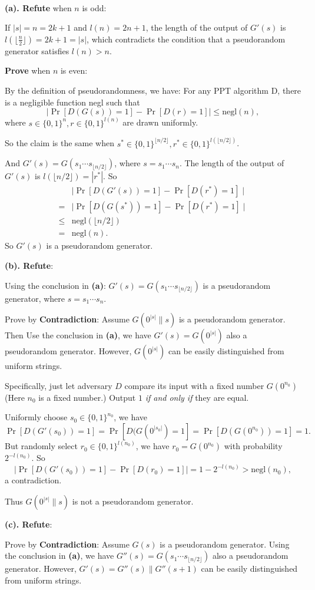 \documentclass[12pt]{article}
\newcommand{\negl}{\text{negl}}
\newenvironment{problem}[2][Problem]{\begin{trivlist}
\item[\hskip \labelsep {\bfseries #1}\hskip \labelsep {\bfseries #2.}]}{\end{trivlist}}
\begin{document}
\begin{problem}{3.6}
$ $\par
\textbf{(a). Refute} when $n$ is odd: \par
If $|s|=n=2k+1$ and $l(n)=2n+1$, the length of the output of $G'(s)$ is $l(\lfloor\frac n2\rfloor)=2k+1=|s|$, which contradicts the condition that a pseudorandom generator satisfies $l(n)>n$.\par
\vspace{2ex}
\textbf{Prove} when $n$ is even:\par
By the definition of pseudorandomness, we have: For any PPT algorithm D, there is a negligible function negl such that
\[ \mid\Pr[D(G(s))=1]-\Pr[D(r)=1]\mid\le\negl(n), \]
where $s\in\{0,1\}^n,r\in\{0,1\}^{l(n)}$ are drawn uniformly.\par
So the claim is the same when $s^*\in\{0,1\}^{\lfloor n/2\rfloor},r^*\in\{0,1\}^{l(\lfloor n/2\rfloor)}$.\par
And $G'(s)=G(s_1\cdots s_{\lfloor n/2\rfloor})$, where $s=s_1\cdots s_n$. The length of the output of $G'(s)$ is $l(\lfloor n/2\rfloor)=|r^*|$. So 
\begin{align*}
    &\mid\Pr[D(G'(s))=1]-\Pr[D(r^*)=1]\mid\\
    =&\mid\Pr[D(G(s^*))=1]-\Pr[D(r^*)=1]\mid\\
    \le &\negl(\lfloor n/2\rfloor)\\
    =&\negl(n).
\end{align*}
So $G'(s)$ is a pseudorandom generator.\par\vspace{3ex}
\textbf{(b). Refute}: \par
Using the conclusion in \textbf{(a)}: $G'(s)=G(s_1\cdots s_{\lfloor n/2\rfloor})$ is a pseudorandom generator, where $s=s_1\cdots s_n$. \par
Prove by \textbf{Contradiction}: Assume $G(0^{|s|}\|s)$ is a pseudorandom generator. Then Use the conclusion in \textbf{(a)}, we have $G'(s)=G(0^{|s|})$ also a pseudorandom generator. However, $G(0^{|s|})$ can be easily distinguished from uniform strings. 

Specifically, just let adversary $D$ compare its input with a fixed number $G(0^{n_0})$(Here $n_0$ is a fixed number.) Output $1$ \textit{if and only if} they are equal.

Uniformly choose $s_0\in\{0,1\}^{n_0}$, we have $$\Pr[D(G'(s_0))=1]=\Pr[D(G(0^{|s_0|})=1]=\Pr[D(G(0^{n_0}))=1]=1.$$ 
But randomly select $r_0\in\{0,1\}^{l(n_0)}$, we have $r_0=G(0^{n_0})$ with probability $2^{-l(n_0)}$. So
\[\mid\Pr[D(G'(s_0))=1]-\Pr[D(r_0)=1]\mid=1-2^{-l(n_0)}>\negl(n_0),\]
a contradiction.\par
Thus $G(0^{|s|}\|s)$ is not a pseudorandom generator.\par
\vspace{3ex}
\textbf{(c). Refute}: \par
Prove by \textbf{Contradiction}: 
Assume $G(s)$ is a pseudorandom generator. 
Using the conclusion in \textbf{(a)}, we have $G''(s)=G(s_1\cdots s_{\lfloor n/2\rfloor})$ also a pseudorandom generator. 
However, $G'(s)=G''(s)\|G''(s+1)$ can be easily distinguished from uniform strings. 


\end{problem}
\end{document}
